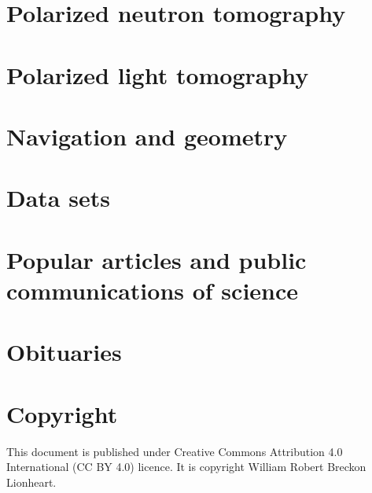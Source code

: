 \documentclass[]{article}
\begin{document}
\section{Polarized neutron tomography}

\section{Polarized light tomography}

\section{Navigation and geometry}

\section{Data sets}

\section{Popular articles and public communications of science}

\section{Obituaries}

\section*{Copyright}
This document is published under Creative Commons Attribution 4.0 International (CC BY 4.0) licence. It is copyright \textcopyright William Robert Breckon Lionheart.

{}

\end{document}
